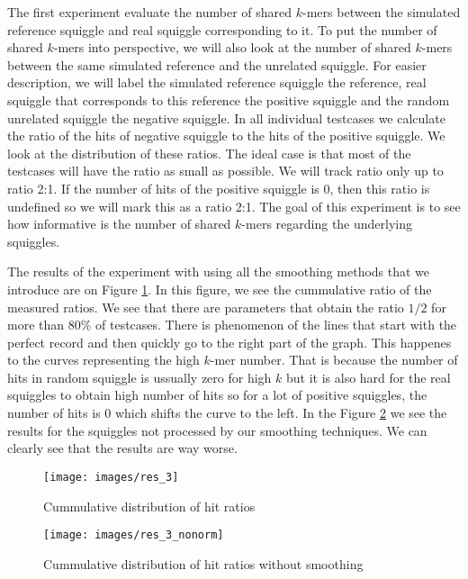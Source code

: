 The first experiment evaluate the number of shared $k$-mers between the simulated
reference squiggle and real squiggle corresponding to it. To put the number of shared
$k$-mers into perspective, we will also look at the number of shared $k$-mers between the
same simulated reference and the unrelated squiggle. For easier description, we will
label the simulated reference squiggle the reference, real squiggle that corresponds
to this reference the positive squiggle and the random unrelated squiggle the negative squiggle.
In all individual testcases we calculate the ratio of the hits of negative squiggle
to the hits of the positive squiggle. We look at the distribution of these ratios.
The ideal case is that most of the testcases will have the ratio as small as possible. We will
track ratio only up to ratio 2:1. If the number of hits of the positive squiggle is $0$,
then this ratio is undefined so we will mark this as a ratio 2:1. The goal of this
experiment is to see how informative is the number of shared $k$-mers regarding the underlying squiggles.

The results of the experiment with using all the smoothing methods that we introduce are on Figure \ref{obr:res_3}.
In this figure, we see the cummulative ratio of the measured ratios.
We see that there are parameters that obtain the ratio $1/2$ for more than 80\% of testcases. 
There is phenomenon of the lines that start with the perfect record and then quickly
go to the right part of the graph. This happenes to the curves representing
the high $k$-mer number. That is because the number of hits in random squiggle is ussually zero
for high $k$ but it is also hard for the real squiggles to obtain
high number of hits so for a lot of positive squiggles, the number of hits is 0 which
shifts the curve to the left. In the Figure \ref{obr:res_3_nonorm} we see the results
for the squiggles not processed by our smoothing techniques. We can clearly see that
the results are way worse.

\begin{figure}
\centerline{\texttt{[image: images/res\_3]}}
\caption[TODO]{Cummulative distribution of hit ratios}
\label{obr:res_3}
\end{figure}

\begin{figure}
\centerline{\texttt{[image: images/res\_3\_nonorm]}}
\caption[TODO]{Cummulative distribution of hit ratios without smoothing}
\label{obr:res_3_nonorm}
\end{figure}

